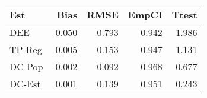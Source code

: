
\begin{tabular}{lrrrr}
\toprule
Est & Bias & RMSE & EmpCI & Ttest\\
\midrule
DEE & -0.050 & 0.793 & 0.942 & 1.986\\
TP-Reg & 0.005 & 0.153 & 0.947 & 1.131\\
DC-Pop & 0.002 & 0.092 & 0.968 & 0.677\\
DC-Est & 0.001 & 0.139 & 0.951 & 0.243\\
\bottomrule
\end{tabular}
